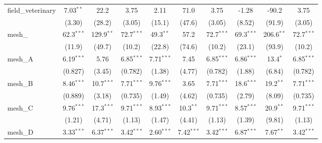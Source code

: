 \begin{tabular}{lccccccccc}
   field\_veterinary                                           & 7.03$^{**}$   & 22.2           & 3.75          & 2.11          & 71.0           & 3.75          & -1.28         & -90.2          & 3.75\\   
                                                               & (3.30)        & (28.2)         & (3.05)        & (15.1)        & (47.6)         & (3.05)        & (8.52)        & (91.9)         & (3.05)\\   
   mesh\_                                                      & 62.3$^{***}$  & 129.9$^{**}$   & 72.7$^{***}$  & 49.3$^{**}$   & 57.2           & 72.7$^{***}$  & 69.3$^{***}$  & 206.6$^{**}$   & 72.7$^{***}$\\   
                                                               & (11.9)        & (49.7)         & (10.2)        & (22.8)        & (74.6)         & (10.2)        & (23.1)        & (93.9)         & (10.2)\\   
   mesh\_A                                                     & 6.19$^{***}$  & 5.76           & 6.85$^{***}$  & 7.71$^{***}$  & 7.45           & 6.85$^{***}$  & 6.86$^{***}$  & 13.4$^{*}$     & 6.85$^{***}$\\   
                                                               & (0.827)       & (3.45)         & (0.782)       & (1.38)        & (4.77)         & (0.782)       & (1.88)        & (6.84)         & (0.782)\\   
   mesh\_B                                                     & 8.46$^{***}$  & 10.7$^{***}$   & 7.71$^{***}$  & 9.76$^{***}$  & 3.65           & 7.71$^{***}$  & 18.6$^{***}$  & 19.2$^{**}$    & 7.71$^{***}$\\   
                                                               & (0.889)       & (3.18)         & (0.735)       & (1.49)        & (4.62)         & (0.735)       & (2.79)        & (8.09)         & (0.735)\\   
   mesh\_C                                                     & 9.76$^{***}$  & 17.3$^{***}$   & 9.71$^{***}$  & 8.93$^{***}$  & 10.3$^{**}$    & 9.71$^{***}$  & 8.57$^{***}$  & 20.9$^{**}$    & 9.71$^{***}$\\   
                                                               & (1.21)        & (4.71)         & (1.13)        & (1.47)        & (4.41)         & (1.13)        & (1.39)        & (9.81)         & (1.13)\\   
   mesh\_D                                                     & 3.33$^{***}$  & 6.37$^{***}$   & 3.42$^{***}$  & 2.60$^{***}$  & 7.42$^{***}$   & 3.42$^{***}$  & 6.87$^{***}$  & 7.67$^{**}$    & 3.42$^{***}$\\   

\end{tabular}

